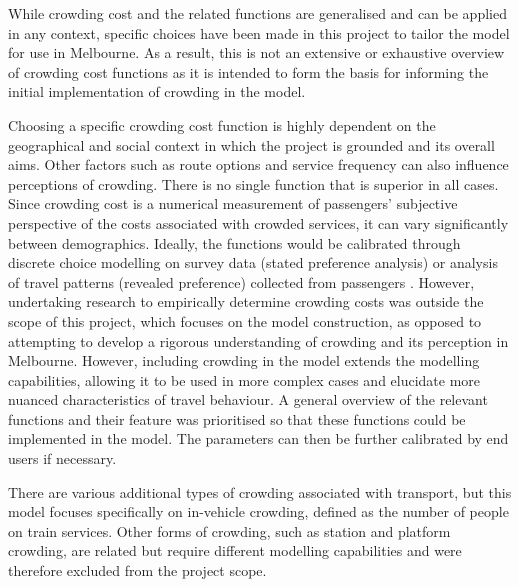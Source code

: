 While crowding cost and the related functions are generalised and can be applied in any context, specific choices have been made in this project to tailor the model for use in Melbourne. As a result, this is not an extensive or exhaustive overview of crowding cost functions as it is intended to form the basis for informing the initial implementation of crowding in the model. 

Choosing a specific crowding cost function is highly dependent on the geographical and social context in which the project is grounded and its overall aims. Other factors such as route options and service frequency can also influence perceptions of crowding. There is no single function that is superior in all cases. Since crowding cost is a numerical measurement of passengers' subjective perspective of the costs associated with crowded services, it can vary significantly between demographics. Ideally, the functions would be calibrated through discrete choice modelling on survey data (stated preference analysis) or analysis of travel patterns (revealed preference) collected from passengers \cite{yapCrowdingValuationUrban2020, tirachiniValuationSittingStanding2016, yapPublicTransportCrowding2023, celebiMeasuringCrowdingrelatedComfort2020}. However, undertaking research to empirically determine crowding costs was outside the scope of this project, which focuses on the model construction, as opposed to attempting to develop a rigorous understanding of crowding and its perception in Melbourne. However, including crowding in the model extends the modelling capabilities, allowing it to be used in more complex cases and elucidate more nuanced characteristics of travel behaviour. A general overview of the relevant functions and their feature was prioritised so that these functions could be implemented in the model. The parameters can then be further calibrated by end users if necessary. 

There are various additional types of crowding associated with transport, but this model focuses specifically on in-vehicle crowding, defined as the number of people on train services. Other forms of crowding, such as station and platform crowding, are related but require different modelling capabilities and were therefore excluded from the project scope. 


